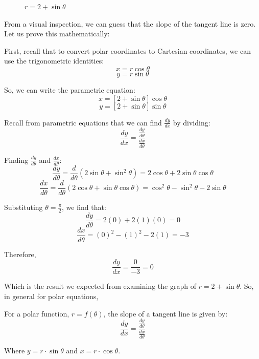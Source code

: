\begin{figure}[H]
\centering
    \caption{$r = 2 + \sin{\theta}$}
    \label{fig:cardioid}
    \end{figure}

From a visual inspection, we can guess that the slope of the tangent line is 
zero. Let us prove this mathematically:

First, recall that to convert polar coordinates to Cartesian coordinates, we 
can use the trigonometric identities:
$$x = r\cos{\theta}$$
$$y = r\sin{\theta}$$

So, we can write the parametric equation:
$$x = \left[2 + \sin{\theta} \right]\cos{\theta}$$
$$y = \left[ 2 + \sin{\theta} \right]\sin{\theta}$$

Recall from parametric equations that we can find $\frac{dy}{dx}$ by dividing:
$$\frac{dy}{dx} = \frac{\frac{dy}{d\theta}}{\frac{dx}{d\theta}}$$

Finding $\frac{dy}{d\theta}$ and $\frac{dx}{d\theta}$:
$$\frac{dy}{d\theta} = \frac{d}{d\theta} \left( 2\sin{\theta} + \sin^2{\theta} 
\right) = 2\cos{\theta} + 2\sin{\theta}\cos{\theta}$$
$$\frac{dx}{d\theta} = \frac{d}{d\theta} \left( 2\cos{\theta} + \sin{\theta}
\cos{\theta} \right) = \cos^2{\theta} - \sin^2{\theta} - 2\sin{\theta}$$

Substituting $\theta = \frac{\pi}{2}$, we find that:
$$\frac{dy}{d\theta} = 2(0) + 2(1)(0) = 0$$
$$\frac{dx}{d\theta} = (0)^2 - (1)^2 - 2(1) = -3$$

Therefore,
$$\frac{dy}{dx} = \frac{0}{-3} = 0$$

Which is the result we expected from examining the graph of $r = 2 + \sin{
\theta}$. 
So, in general for polar equations, 
\begin{mdframed}[style=important, frametitle={Tangent to a Polar Function}]
For a polar function, $r = f(\theta)$, the slope of a tangent line is given by:
$$\frac{dy}{dx} = \frac{\frac{dy}{d\theta}}{\frac{dx}{d\theta}}$$

Where $y = r \cdot \sin{\theta}$ and $x = r \cdot \cos{\theta}$. 
\end{mdframed}

